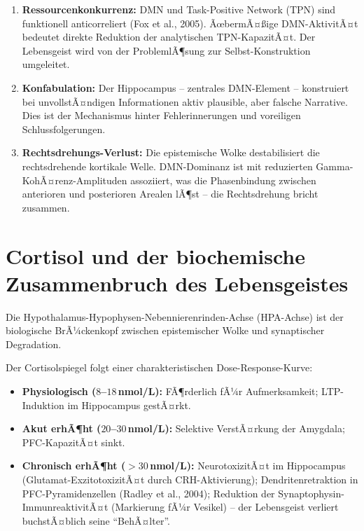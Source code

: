 ﻿\documentclass[12pt,a4paper]{report}
\theoremstyle{plain}
\theoremstyle{definition}
\theoremstyle{remark}
\begin{document}
	\begin{enumerate}[label=\arabic*., leftmargin=1.6cm]
		\item \textbf{Ressourcenkonkurrenz:} DMN und Task-Positive Network (TPN)
		sind funktionell anticorreliert (Fox et al., 2005).
		ÃœbermÃ¤\ss{}ige DMN-AktivitÃ¤t bedeutet direkte Reduktion
		der analytischen TPN-KapazitÃ¤t. Der Lebensgeist wird von der
		ProblemlÃ¶sung zur Selbst-Konstruktion umgeleitet.
		\item \textbf{Konfabulation:} Der Hippocampus -- zentrales DMN-Element --
		konstruiert bei unvollstÃ¤ndigen Informationen aktiv plausible,
		aber falsche Narrative. Dies ist der Mechanismus hinter
		Fehlerinnerungen und voreiligen Schlussfolgerungen.
		\item \textbf{Rechtsdrehungs-Verlust:} Die epistemische Wolke destabilisiert
		die rechtsdrehende kortikale Welle. DMN-Dominanz ist mit reduzierten
		Gamma-KohÃ¤renz-Amplituden assoziiert, was die Phasenbindung
		zwischen anterioren und posterioren Arealen lÃ¶st --
		die Rechtsdrehung bricht zusammen.
	\end{enumerate}
	
	\section{Cortisol und der biochemische Zusammenbruch des Lebensgeistes}
	
	Die Hypothalamus-Hypophysen-Nebennierenrinden-Achse (HPA-Achse) ist
	der biologische BrÃ¼ckenkopf zwischen epistemischer Wolke und
	synaptischer Degradation.
	
	Der Cortisolspiegel folgt einer charakteristischen Dose-Response-Kurve:
	\begin{itemize}
		\item \textbf{Physiologisch ($8$--$18$\,nmol/L):} FÃ¶rderlich fÃ¼r
		Aufmerksamkeit; LTP-Induktion im Hippocampus gestÃ¤rkt.
		\item \textbf{Akut erhÃ¶ht ($20$--$30$\,nmol/L):} Selektive
		VerstÃ¤rkung der Amygdala; PFC-Kapa\-zitÃ¤t sinkt.
		\item \textbf{Chronisch erhÃ¶ht ($>30$\,nmol/L):} NeurotoxizitÃ¤t
		im Hippocampus (Glutamat-ExzitotoxizitÃ¤t durch CRH-Aktivierung);
		Dendritenretraktion in PFC-Pyramidenzel\-len (Radley et al., 2004);
		Reduktion der Synaptophysin-ImmunreaktivitÃ¤t (Markierung fÃ¼r
		Vesikel) -- der Lebensgeist verliert buchstÃ¤blich seine
		``BehÃ¤lter''.
	\end{itemize}

\end{document}
